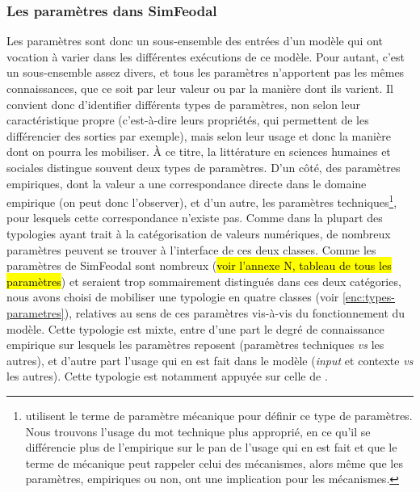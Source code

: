 \subsubsection{Les paramètres dans SimFeodal \label{sssec:types-parametres}}

Les paramètres sont donc un sous-ensemble des entrées d'un modèle qui ont vocation à varier dans les différentes exécutions de ce modèle.
Pour autant, c'est un sous-ensemble assez divers, et tous les paramètres n'apportent pas les mêmes connaissances, que ce soit par leur valeur ou par la manière dont ils varient.
Il convient donc d'identifier différents types de paramètres, non selon leur caractéristique propre (c'est-à-dire leurs propriétés, qui permettent de les différencier des sorties par exemple), mais selon leur usage et donc la manière dont on pourra les mobiliser.
À ce titre, la littérature en sciences humaines et sociales
distingue souvent deux types de paramètres.
D'un côté, des paramètres empiriques, dont la valeur a une correspondance directe dans le domaine empirique (on peut donc l'observer), et d'un autre, les paramètres techniques\footnote{
		\textcite{mathian_formalisation_2015} utilisent le terme de paramètre mécanique pour définir ce type de paramètres.
		Nous trouvons l'usage du mot \og technique\fg{} plus approprié, en ce qu'il se différencie plus de l'empirique sur le pan de l'usage qui en est fait et que le terme de \og mécanique\fg{} peut rappeler celui des mécanismes, alors même que les paramètres, empiriques ou non, ont une implication pour les mécanismes.
}, pour lesquels cette correspondance n'existe pas.
Comme dans la plupart des typologies ayant trait à la catégorisation de valeurs numériques, de nombreux paramètres peuvent se trouver à l'interface de ces deux classes.
Comme les paramètres de SimFeodal sont nombreux (\hl{voir l'annexe N, tableau de tous les paramètres}) et seraient trop sommairement distingués dans ces deux catégories, nous avons choisi de mobiliser une typologie en quatre classes (voir \cref{enc:types-parametres}), relatives au sens de ces paramètres vis-à-vis du fonctionnement du modèle.
Cette typologie est mixte, entre d'une part le degré de connaissance empirique sur lesquels les paramètres reposent (paramètres techniques \textit{vs} les autres), et d'autre part l'usage qui en est fait dans le modèle (\textit{input} et contexte \textit{vs} les autres).
Cette typologie est notamment appuyée sur celle de \textcite[45]{tannier_analyse_2017}.


